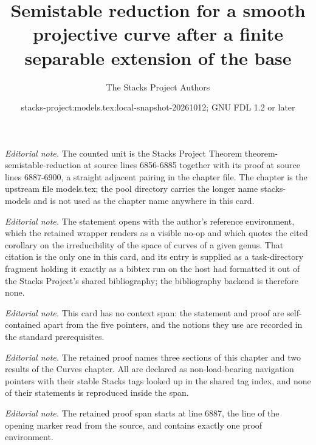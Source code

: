 \documentclass[10pt,a4paper]{amsart}
\title{Semistable reduction for a smooth projective curve after a finite separable extension of the base}
\author{The Stacks Project Authors}
\date{stacks-project:models.tex:local-snapshot-20261012; GNU FDL 1.2 or later}
\theoremstyle{plain}
\theoremstyle{definition}
\theoremstyle{remark}
\numberwithin{equation}{subsection}
\begin{document}
\maketitle
\noindent\textit{Editorial note.} The counted unit is the Stacks Project Theorem theorem-semistable-reduction at source lines 6856-6885 together with its proof at source lines 6887-6900, a straight adjacent pairing in the chapter file. The chapter is the upstream file models.tex; the pool directory carries the longer name stacks-models and is not used as the chapter name anywhere in this card.\par\medskip
\noindent\textit{Editorial note.} The statement opens with the author's reference environment, which the retained wrapper renders as a visible no-op and which quotes the cited corollary on the irreducibility of the space of curves of a given genus. That citation is the only one in this card, and its entry is supplied as a task-directory fragment holding it exactly as a bibtex run on the host had formatted it out of the Stacks Project's shared bibliography; the bibliography backend is therefore none.\par\medskip
\noindent\textit{Editorial note.} This card has no context span: the statement and proof are self-contained apart from the five pointers, and the notions they use are recorded in the standard prerequisites.\par\medskip
\noindent\textit{Editorial note.} The retained proof names three sections of this chapter and two results of the Curves chapter. All are declared as non-load-bearing navigation pointers with their stable Stacks tags looked up in the shared tag index, and none of their statements is reproduced inside the span.\par\medskip
\noindent\textit{Editorial note.} The retained proof span starts at line 6887, the line of the opening marker read from the source, and contains exactly one proof environment.\par\medskip
\end{document}
